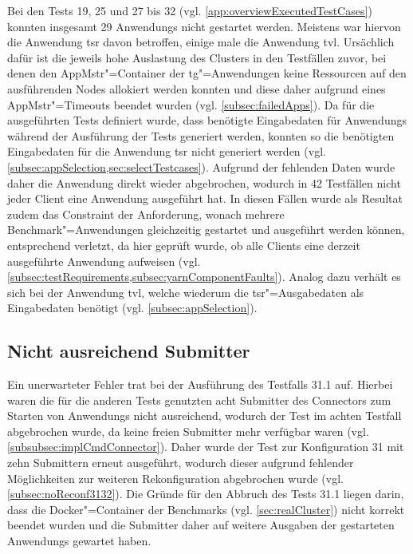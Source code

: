 Bei den \glspl{Test} 19, 25 und 27 bis 32  (vgl. \cref{app:overviewExecutedTestCases}) konnten insgesamt 29 \glspl{Anwendung} nicht gestartet werden.
Meistens war hiervon die \gls{Anwendung} \acrlong{tsr} davon betroffen, einige male die \gls{Anwendung} \acrlong{tvl}.
Ursächlich dafür ist die jeweils hohe Auslastung des Clusters in den Testfällen zuvor, bei denen den \gls{AppMstr}"=Container der \acrlong{tg}"=Anwendungen keine Ressourcen auf den ausführenden Nodes allokiert werden konnten und diese daher aufgrund eines \gls{AppMstr}"=Timeouts beendet wurden (vgl. \cref{subsec:failedApps}).
Da für die ausgeführten Tests definiert wurde, dass benötigte Eingabedaten für \glspl{Anwendung} während der Ausführung der \glspl{Test} generiert werden, konnten so die benötigten Eingabedaten für die \gls{Anwendung} \acrlong{tsr} nicht generiert werden (vgl. \cref{subsec:appSelection,sec:selectTestcases}).
Aufgrund der fehlenden Daten wurde daher die \gls{Anwendung} direkt wieder abgebrochen, wodurch in 42 Testfällen nicht jeder Client eine \gls{Anwendung} ausgeführt hat.
In diesen Fällen wurde als Resultat zudem das Constraint der Anforderung, wonach mehrere Benchmark"=Anwendungen gleichzeitig gestartet und ausgeführt werden können, entsprechend verletzt, da hier geprüft wurde, ob alle Clients eine derzeit ausgeführte Anwendung aufweisen (vgl. \cref{subsec:testRequirements,subsec:yarnComponentFaults}).
Analog dazu verhält es sich bei der \gls{Anwendung} \acrlong{tvl}, welche wiederum die \acrlong{tsr}"=Ausgabedaten als Eingabedaten benötigt (vgl. \cref{subsec:appSelection}).

\subsection{Nicht ausreichend Submitter}
\label{subsec:notEnoughSubmitter}

Ein unerwarteter Fehler trat bei der Ausführung des Testfalls 31.1 auf.
Hierbei waren die für die anderen Tests genutzten acht Submitter des Connectors zum Starten von \glspl{Anwendung} nicht ausreichend, wodurch der Test im achten Testfall abgebrochen wurde, da keine freien Submitter mehr verfügbar waren (vgl. \cref{subsubsec:implCmdConnector}).
Daher wurde der \gls{Test} zur Konfiguration 31 mit zehn Submittern erneut ausgeführt, wodurch dieser aufgrund fehlender Möglichkeiten zur weiteren Rekonfiguration abgebrochen wurde (vgl. \cref{subsec:noReconf3132}).
Die Gründe für den Abbruch des \glspl{Test} 31.1 liegen darin, dass die Docker"=Container der Benchmarks (vgl. \cref{sec:realCluster}) nicht korrekt beendet wurden und die Submitter daher auf weitere Ausgaben der gestarteten \glspl{Anwendung} gewartet haben.
